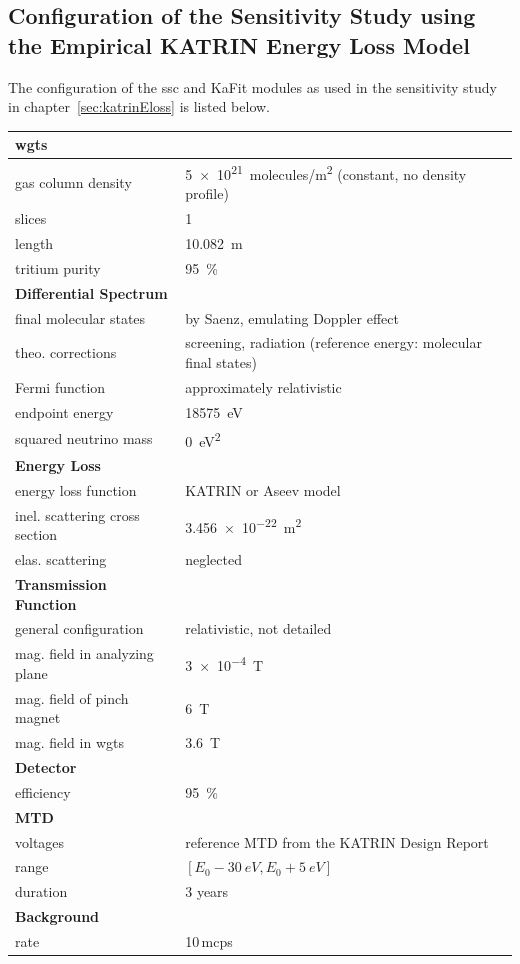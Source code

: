 \begin{samepage}
\section{Configuration of the Sensitivity Study using the Empirical KATRIN Energy Loss Model}
\label{sec:appendixKatrinElossSSCConfig}
The configuration of the \gls{ssc} and KaFit modules as used in the sensitivity study in chapter~\ref{sec:katrinEloss} is listed below.

\newcommand{\myModelConfigTableStrut}{\rule{0pt}{4ex}}
\begin{tabular}{ll}
	\toprule
	\textbf{\gls{wgts}} & \\
	\midrule
	gas column density & \SI{5e21}{molecules/m^2} (constant, no density profile) \\
	slices & 1 \\
	length & \SI{10.082}{m} \\
	tritium purity & \SI{95}{\percent} \\
	\myModelConfigTableStrut
	\textbf{Differential Spectrum} & \\
	\midrule
	final molecular states & by Saenz, emulating Doppler effect \\
	theo. corrections & screening, radiation (reference energy: molecular final states) \\
	Fermi function & approximately relativistic \\
	endpoint energy & \SI{18575}{eV} \\
	squared neutrino mass & \SI{0}{eV^2} \\
	\myModelConfigTableStrut
	\textbf{Energy Loss} & \\
	\midrule
	energy loss function & KATRIN or Aseev model \\
	inel. scattering cross section & \SI{3.456e-22}{m^2} \\
	elas. scattering & neglected \\
	\myModelConfigTableStrut
	\textbf{Transmission Function} & \\
	\midrule
	general configuration & relativistic, not detailed \\
	mag. field in analyzing plane & \SI{3e-4}{T} \\
	mag. field of pinch magnet & \SI{6}{T} \\
	mag. field in \gls{wgts} & \SI{3.6}{T} \\
	\myModelConfigTableStrut
	\textbf{Detector} & \\
	\midrule
	efficiency & \SI{95}{\percent} \\
	\myModelConfigTableStrut
	\textbf{MTD} & \\
	\midrule
	voltages & reference MTD from the KATRIN Design Report \\
	range & $[E_0-\SI{30}{eV},E_0+\SI{5}{eV}]$ \\
	duration & 3 years \\
	\myModelConfigTableStrut
	\textbf{Background} & \\
	\midrule
	rate & 10\,mcps \\
	\bottomrule
\end{tabular}
\end{samepage}